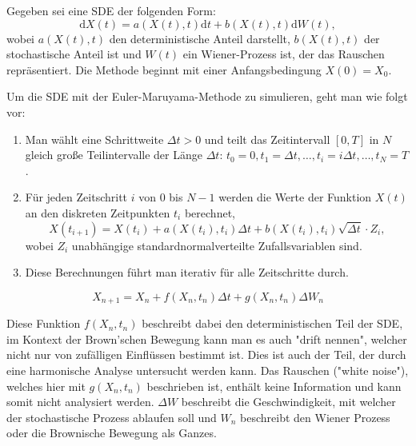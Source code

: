 Gegeben sei eine SDE der folgenden Form:
\begin{equation}
	\mathrm{d}X(t) = a(X(t), t) \mathrm{d}t + b(X(t), t) \mathrm{d}W(t),
\end{equation}
wobei $ a(X(t), t) $ den deterministische Anteil darstellt, $ b(X(t), t) $ der stochastische Anteil ist und $ W(t) $ ein Wiener-Prozess ist, der das Rauschen repräsentiert. Die Methode beginnt mit einer Anfangsbedingung $X(0) = X_0$.

Um die SDE mit der Euler-Maruyama-Methode zu simulieren, geht man wie folgt vor:

\begin{enumerate}
	\item Man wählt eine Schrittweite $\Delta t > 0$ und teilt das Zeitintervall $[0, T]$ in $N$ gleich große Teilintervalle der Länge $\Delta t$: $t_0 = 0, t_1 = \Delta t, \dots, t_i = i\Delta t, \dots, t_N = T$.
	\item Für jeden Zeitschritt $i$ von $0$ bis $N-1$ werden die Werte der Funktion $X(t)$ an den diskreten Zeitpunkten $t_i$ berechnet,
	\begin{equation}
		X(t_{i+1}) = X(t_i) + a(X(t_i), t_i) \Delta t + b(X(t_i), t_i) \sqrt{\Delta t} \cdot Z_i,
	\end{equation}
	wobei $Z_i$ unabhängige standardnormalverteilte Zufallsvariablen sind.
	\item Diese Berechnungen führt man iterativ für alle Zeitschritte durch.
\end{enumerate}

\begin{equation}
	X_{n+1} = X_n + f(X_n,t_n) \Delta t + g(X_n,t_n) \Delta W_n
\end{equation}

Diese Funktion $ f(X_n,t_n) $ beschreibt dabei den deterministischen Teil der SDE, im Kontext der Brown'schen Bewegung kann man es auch "drift nennen", welcher nicht nur von zufälligen Einflüssen bestimmt ist. Dies ist auch der Teil, der durch eine harmonische Analyse untersucht werden kann. Das Rauschen ("white noise"), welches hier mit $ g(X_n,t_n) $ beschrieben ist, enthält keine Information und kann somit nicht analysiert werden. $ \Delta W $ beschreibt die Geschwindigkeit, mit welcher der stochastische Prozess ablaufen soll und $ W_n $  beschreibt den Wiener Prozess oder die Brownische Bewegung als Ganzes.

